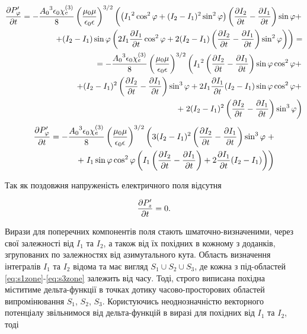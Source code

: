 \textcolor{blue} { \begin{equation*} \begin{aligned}
\frac{\partial P_\varphi^\prime}{\partial t}   = 
- \frac{ {A_0}^3 \epsilon_0 \chi_e^{(3)} }{ 8 } 
\left( \frac{\mu_0 \mu} {\epsilon_0 \epsilon} \right)^{3/2} \left(
\left( {I_1}^2 \cos^2 \varphi + ( I_2 - I_1 )^2 \sin^2 \varphi \right)
\left( \frac{\partial I_2}{\partial t} - \frac{\partial I_1}{\partial t} \right) \sin \varphi + \right. \\
\left. + (I_2 - I_1) \sin \varphi \left( 2 I_1 \frac{\partial I_1}{\partial t} \cos^2 \varphi + 
2 ( I_2 - I_1 ) \left( \frac{\partial I_2}{\partial t} - \frac{\partial I_1}{\partial t} \right) 
\sin^2 \varphi \right) \right) = \\ 
= - \frac{ {A_0}^3 \epsilon_0 \chi_e^{(3)} }{ 8 } 
\left( \frac{\mu_0 \mu} {\epsilon_0 \epsilon} \right)^{3/2} \left(
{I_1}^2 \left( \frac{\partial I_2}{\partial t} - \frac{\partial I_1}{\partial t} \right) 
\sin \varphi \cos^2 \varphi + \right. \\ \left. 
+ ( I_2 - I_1 )^2 \left( \frac{\partial I_2}{\partial t} - \frac{\partial I_1}{\partial t} \right) 
\sin^3 \varphi + 2 I_1 \frac{\partial I_1}{\partial t} (I_2 - I_1) 
\sin \varphi \cos^2 \varphi + \right. \\ 
+ \left. 2 ( I_2 - I_1 )^2 \left( \frac{\partial I_2}{\partial t} - \frac{\partial I_1}{\partial t} \right) 
\sin^3 \varphi \right)
\end{aligned} \end{equation*} }
%
\begin{equation*} \begin{aligned}
\frac{\partial P_\varphi^\prime}{\partial t} = 
- \frac{ {A_0}^3 \epsilon_0 \chi_e^{(3)} }{ 8 } 
\left( \frac{\mu_0 \mu} {\epsilon_0 \epsilon} \right)^{3/2} \left(
3 ( I_2 - I_1 )^2 \left( \frac{\partial I_2}{\partial t} - \frac{\partial I_1}{\partial t} \right)
\sin^3 \varphi \right. + \\
+ \left. I_1 \sin \varphi \cos^2 \varphi \left( 
I_1 \left( \frac{\partial I_2}{\partial t} - \frac{\partial I_1}{\partial t} \right) + 
2 \frac{\partial I_1}{\partial t} (I_2 - I_1) \right) \right)
\end{aligned} \end{equation*}

Так як поздовжня напруженість електричного поля відсутня 

\begin{equation*} \begin{aligned}
\frac{\partial P_z^\prime}{\partial t} = 0.
\end{aligned} \end{equation*}

Вирази для поперечних компонентів поля стають шматочно-визначеними,
через свої залежності від $ I_1 $ та $ I_2 $, а також від їх похідних в 
кожному з доданків, згрупованих по залежностях від азимутального кута.
Область визначення інтегралів $ I_1 $ та $ I_2 $ відома та має вигляд 
$ S_1 \cup S_2 \cup S_3 $, де кожна з під-областей 
\eqref{eq:s1zone}-\eqref{eq:s3zone} залежить від часу.
Тоді, строго виписана похідна міститиме дельта-функції в точках дотику
часово-просторових областей випромінювання $ S_1 $, $ S_2 $, $ S_3 $.
Користуючись неоднозначністю векторного потенціалу 
\cite[ст. 77]{imp:LandauII} звільнимося від дельта-функцій в виразі для 
похідних від $ I_1 $ та $ I_2 $, тоді

